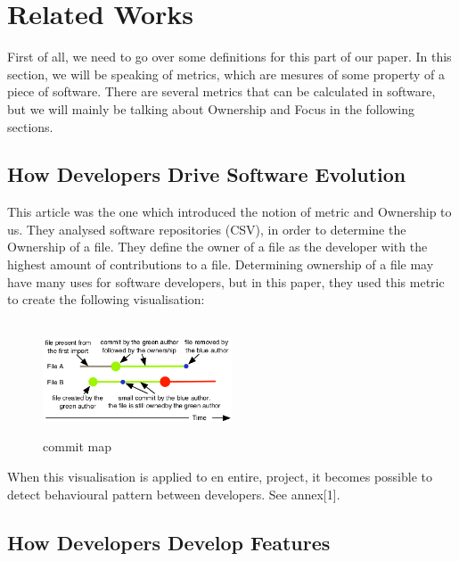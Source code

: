 \section{Related Works}

First of all, we need to go over some definitions for this part of our paper. In this section, we will be speaking of metrics, which are mesures of some property of a piece of software. There are several metrics that can be calculated in software, but we will mainly be talking about Ownership and Focus in the following sections.

\subsection{How Developers Drive Software Evolution}

This article was the one which introduced the notion of metric and Ownership to us. They analysed software repositories (CSV), in order to determine the Ownership of a file. They define the owner of a file as the developer with the highest amount of contributions to a file.
Determining ownership of a file may have many uses for software developers, but in this paper, they used this metric to create the following visualisation:\\
\\
\begin{figure}[p]
\includegraphics[width=0.5\textwidth]{./resources/girba2005.png}~
\caption{commit map}
\label{fig:commit_map}
\end{figure}

When this visualisation is applied to en entire, project, it becomes possible to detect behavioural pattern between developers. See annex[1].

\subsection{How Developers Develop Features}

